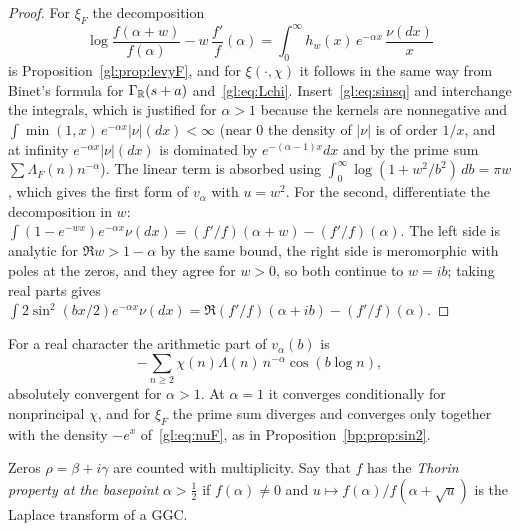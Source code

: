 \begin{proof}
For $\xi_F$ the decomposition
\[
\log\frac{f(\alpha+w)}{f(\alpha)}-w\,\frac{f'}{f}(\alpha)=\int_0^\infty h_w(x)\,e^{-\alpha x}\,\frac{\nu(dx)}x
\]
is Proposition~\ref{gl:prop:levyF}, and for $\xi(\cdot,\chi)$ it follows in the same way from Binet's formula for $\Gamma_{\mathbb{R}}(s+a)$ and~\eqref{gl:eq:Lchi}. Insert~\eqref{gl:eq:sinsq} and interchange the integrals, which is justified for $\alpha>1$ because the kernels are nonnegative and $\int\min(1,x)\,e^{-\alpha x}|\nu|(dx)<\infty$ (near $0$ the density of $|\nu|$ is of order $1/x$, and at infinity $e^{-\alpha x}|\nu|(dx)$ is dominated by $e^{-(\alpha-1)x}dx$ and by the prime sum $\sum\Lambda_F(n)n^{-\alpha}$). The linear term is absorbed using $\int_0^\infty\log(1+w^2/b^2)\,db=\pi w$, which gives the first form of $v_\alpha$ with $u=w^2$. For the second, differentiate the decomposition in $w$: $\int(1-e^{-wx})e^{-\alpha x}\nu(dx)=(f'/f)(\alpha+w)-(f'/f)(\alpha)$. The left side is analytic for $\Re w>1-\alpha$ by the same bound, the right side is meromorphic with poles at the zeros, and they agree for $w>0$, so both continue to $w=ib$; taking real parts gives $\int2\sin^2(bx/2)e^{-\alpha x}\nu(dx)=\Re(f'/f)(\alpha+ib)-(f'/f)(\alpha)$.
\end{proof}

For a real character the arithmetic part of $v_\alpha(b)$ is
\[
-\sum_{n\ge2}\chi(n)\Lambda(n)\,n^{-\alpha}\cos(b\log n),
\]
absolutely convergent for $\alpha>1$. At $\alpha=1$ it converges conditionally for nonprincipal $\chi$, and for $\xi_F$ the prime sum diverges and converges only together with the density $-e^x$ of~\eqref{gl:eq:nuF}, as in Proposition~\ref{bp:prop:sin2}.

Zeros $\rho=\beta+i\gamma$ are counted with multiplicity. Say that $f$ has the \emph{Thorin property at the basepoint} $\alpha>\tfrac12$ if $f(\alpha)\ne0$ and $u\mapsto f(\alpha)/f(\alpha+\sqrt u)$ is the Laplace transform of a GGC.


